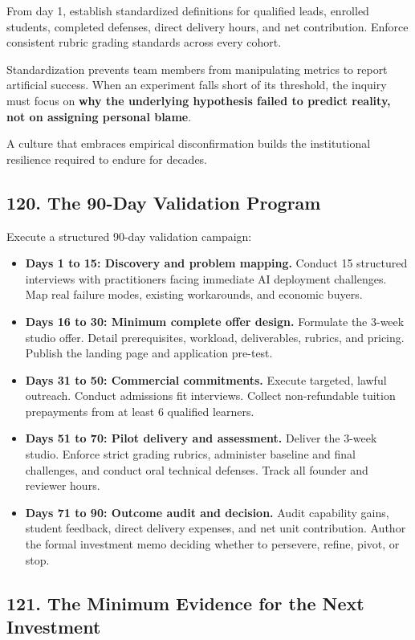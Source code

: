 From day 1, establish standardized definitions for qualified leads, enrolled students, completed defenses, direct delivery hours, and net contribution. Enforce consistent rubric grading standards across every cohort.

Standardization prevents team members from manipulating metrics to report artificial success. When an experiment falls short of its threshold, the inquiry must focus on \textbf{why the underlying hypothesis failed to predict reality, not on assigning personal blame}.

A culture that embraces empirical disconfirmation builds the institutional resilience required to endure for decades.

\subsection*{120. The 90-Day Validation Program}

Execute a structured 90-day validation campaign:

\begin{itemize}
    \item \textbf{Days 1 to 15: Discovery and problem mapping.} Conduct 15 structured interviews with practitioners facing immediate AI deployment challenges. Map real failure modes, existing workarounds, and economic buyers.
    \item \textbf{Days 16 to 30: Minimum complete offer design.} Formulate the 3-week studio offer. Detail prerequisites, workload, deliverables, rubrics, and pricing. Publish the landing page and application pre-test.
    \item \textbf{Days 31 to 50: Commercial commitments.} Execute targeted, lawful outreach. Conduct admissions fit interviews. Collect non-refundable tuition prepayments from at least 6 qualified learners.
    \item \textbf{Days 51 to 70: Pilot delivery and assessment.} Deliver the 3-week studio. Enforce strict grading rubrics, administer baseline and final challenges, and conduct oral technical defenses. Track all founder and reviewer hours.
    \item \textbf{Days 71 to 90: Outcome audit and decision.} Audit capability gains, student feedback, direct delivery expenses, and net unit contribution. Author the formal investment memo deciding whether to persevere, refine, pivot, or stop.
\end{itemize}

\subsection*{121. The Minimum Evidence for the Next Investment}

